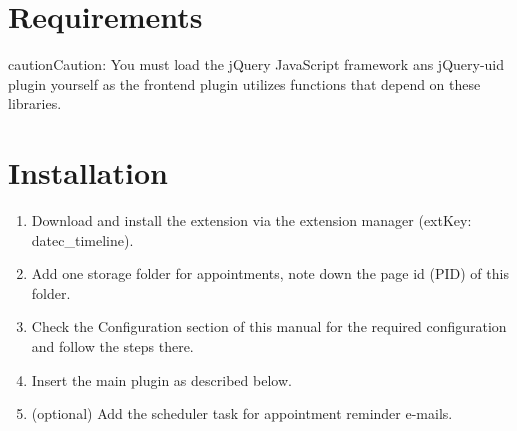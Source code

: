 \documentclass[a4paper,10pt,english]{sphinxmanual}
\begin{document}
\section{Requirements}
\label{AdministratorManual/Index:requirements}
\begin{notice}{caution}{Caution:}
You must load the jQuery JavaScript framework ans jQuery-uid plugin yourself as the frontend plugin utilizes functions that depend on these libraries.
\end{notice}


\section{Installation}
\label{AdministratorManual/Index:installation}\begin{enumerate}
\item {} 
Download and install the extension via the extension manager (extKey: datec\_timeline).

\item {} 
Add one storage folder for appointments, note down the page id (PID) of this folder.

\item {} 
Check the Configuration section of this manual for the required configuration and follow the steps there.

\item {} 
Insert the main plugin as described below.

\item {} 
(optional) Add the scheduler task for appointment reminder e-mails.

\end{enumerate}
\end{document}
